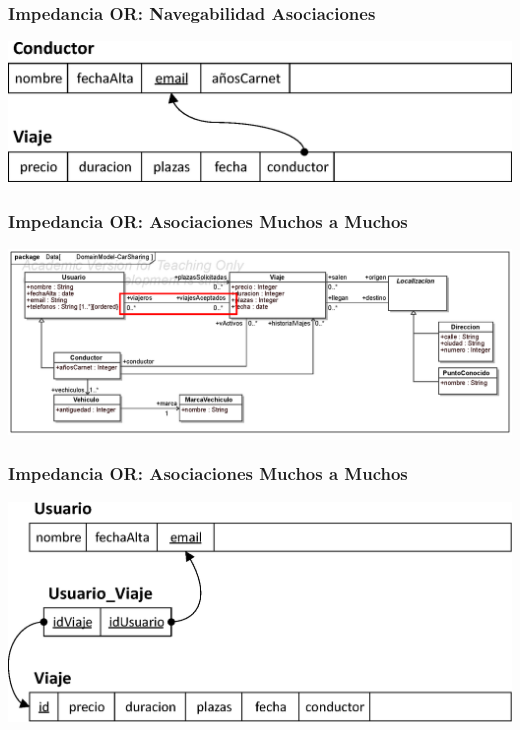 \documentclass[a4paper,slidestop,xcolor=pst,blue]{beamer}
\begin{document}
\begin{frame}[c]
    \frametitle{Impedancia OR: Navegabilidad Asociaciones}
    \begin{center}
        \includegraphics[width=0.8\linewidth]{images/ooMismatch/ooMismatch06.eps}
    \end{center}
\end{frame}

\begin{frame}[c]
    \frametitle{Impedancia OR: Asociaciones Muchos a Muchos}
    \begin{center}
        \includegraphics[width=\linewidth]{images/ooMismatch/ooMismatch07.eps}
    \end{center}
\end{frame}

\begin{frame}[c]
    \frametitle{Impedancia OR: Asociaciones Muchos a Muchos}
    \begin{center}
        \includegraphics[width=0.8\linewidth]{images/ooMismatch/ooMismatch08.eps}
    \end{center}
\end{frame}
\end{document}
